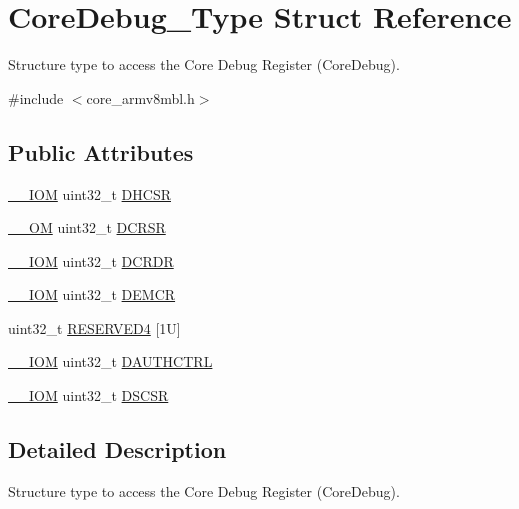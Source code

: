\hypertarget{struct_core_debug___type}{}\section{Core\+Debug\+\_\+\+Type Struct Reference}
\label{struct_core_debug___type}


Structure type to access the Core Debug Register (Core\+Debug).  




{\ttfamily \#include $<$core\+\_\+armv8mbl.\+h$>$}

\subsection*{Public Attributes}
\begin{DoxyCompactItemize}
\item 
\hyperlink{core__sc300_8h_ab6caba5853a60a17e8e04499b52bf691}{\+\_\+\+\_\+\+I\+OM} uint32\+\_\+t \hyperlink{struct_core_debug___type_ad63554e4650da91a8e79929cbb63db66}{D\+H\+C\+SR}
\item 
\hyperlink{core__sc300_8h_a0ea2009ed8fd9ef35b48708280fdb758}{\+\_\+\+\_\+\+OM} uint32\+\_\+t \hyperlink{struct_core_debug___type_af907cf64577eaf927dac6787df6dd98b}{D\+C\+R\+SR}
\item 
\hyperlink{core__sc300_8h_ab6caba5853a60a17e8e04499b52bf691}{\+\_\+\+\_\+\+I\+OM} uint32\+\_\+t \hyperlink{struct_core_debug___type_aab3cc92ef07bc1f04b3a3aa6db2c2d55}{D\+C\+R\+DR}
\item 
\hyperlink{core__sc300_8h_ab6caba5853a60a17e8e04499b52bf691}{\+\_\+\+\_\+\+I\+OM} uint32\+\_\+t \hyperlink{struct_core_debug___type_aeb3126abc4c258a858f21f356c0df6ee}{D\+E\+M\+CR}
\item 
uint32\+\_\+t \hyperlink{struct_core_debug___type_ac965e9b3abb1519676f2a6a959eaedb2}{R\+E\+S\+E\+R\+V\+E\+D4} \mbox{[}1\+U\mbox{]}
\item 
\hyperlink{core__sc300_8h_ab6caba5853a60a17e8e04499b52bf691}{\+\_\+\+\_\+\+I\+OM} uint32\+\_\+t \hyperlink{struct_core_debug___type_a1b319a8279b9ff2572ab5391dba5bb88}{D\+A\+U\+T\+H\+C\+T\+RL}
\item 
\hyperlink{core__sc300_8h_ab6caba5853a60a17e8e04499b52bf691}{\+\_\+\+\_\+\+I\+OM} uint32\+\_\+t \hyperlink{struct_core_debug___type_ad9fa5e915e038e20b9be88d54d432fb8}{D\+S\+C\+SR}
\end{DoxyCompactItemize}


\subsection{Detailed Description}
Structure type to access the Core Debug Register (Core\+Debug). 

